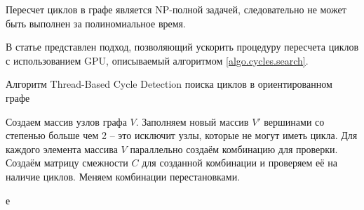 \begin{remark}
Пересчет циклов в графе является NP-полной задачей\cite{Mahdi2011}, следовательно не может быть выполнен за полиномиальное время.
\end{remark}

В статье \cite{Mahdi2011} представлен подход, позволяющий ускорить процедуру пересчета циклов с использованием \textsf{GPU}, описываемый алгоритмом \ref{algo.cycles.search}.

\begin{algorithm}[H]
\caption{Алгоритм Thread-Based Cycle Detection поиска циклов в ориентированном графе}\label{algo.cycles.search}
\begin{algorithmic}[1]
	\State Создаем массив узлов графа $V$.
	\State Заполняем новый массив $V'$ вершинами со степенью больше чем 2 -- это исключит узлы, которые не могут иметь цикла. 
	\State Для каждого элемента массива $V$ параллельно создаём комбинацию для проверки.
	\State Создаём матрицу смежности $C$ для созданной комбинации и проверяем её на наличие циклов.
	\State Меняем комбинации перестановками.
\end{algorithmic}
\end{algorithm}

е\noteattributes{}
